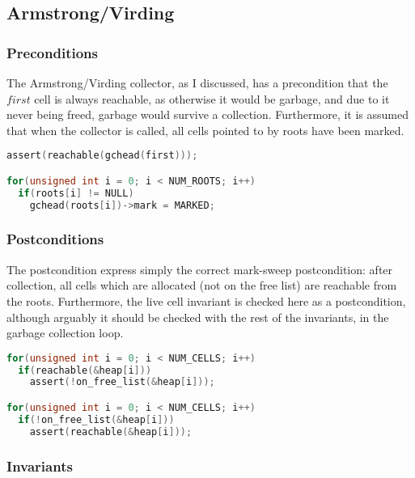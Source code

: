 \subsection{Armstrong/Virding}
\label{sec:results-impl-ms}

\subsubsection{Preconditions}
\label{sec:results-impl-ms-pre}

The Armstrong/Virding collector, as I discussed, has a precondition
that the $first$ cell is always reachable, as otherwise it would be
garbage, and due to it never being freed, garbage would survive a
collection. Furthermore, it is assumed that when the collector is
called, all cells pointed to by roots have been marked.

\begin{lstlisting}[language=C,caption={Armstrong/Virding Preconditions}]
assert(reachable(gchead(first)));

for(unsigned int i = 0; i < NUM_ROOTS; i++)
  if(roots[i] != NULL)
    gchead(roots[i])->mark = MARKED;
\end{lstlisting}

\subsubsection{Postconditions}
\label{sec:results-impl-ms-post}

The postcondition express simply the correct mark-sweep postcondition:
after collection, all cells which are allocated (not on the free list)
are reachable from the roots. Furthermore, the live cell invariant is
checked here as a postcondition, although arguably it should be
checked with the rest of the invariants, in the garbage collection
loop.

\begin{lstlisting}[language=C,caption={Armstrong/Virding Postconditions}]
for(unsigned int i = 0; i < NUM_CELLS; i++)
  if(reachable(&heap[i]))
    assert(!on_free_list(&heap[i]));

for(unsigned int i = 0; i < NUM_CELLS; i++)
  if(!on_free_list(&heap[i]))
    assert(reachable(&heap[i]));
\end{lstlisting}

\subsubsection{Invariants}
\label{sec:results-impl-ms-invariants}

